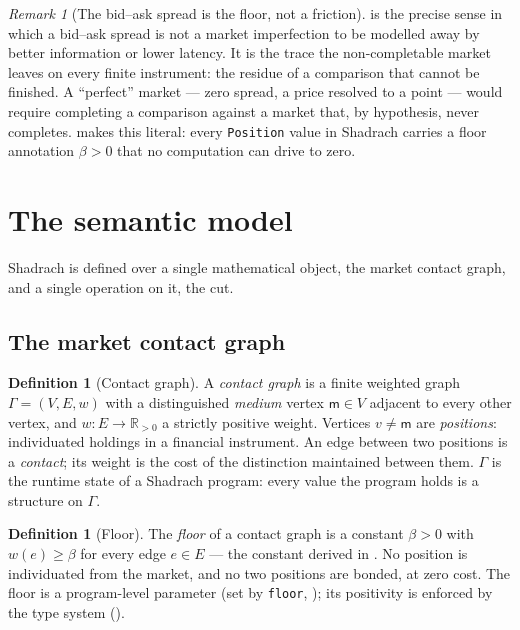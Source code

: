 \documentclass[11pt,a4paper]{article}
\theoremstyle{thmstyle}
\theoremstyle{definition}
\newtheorem{definition}[theorem]{Definition}
\theoremstyle{remark}
\newtheorem{remark}[theorem]{Remark}
\newcommand{\R}{\mathbb{R}}
\newcommand{\Gph}{\Gamma}
\newcommand{\V}{V}
\newcommand{\E}{E}
\newcommand{\wt}{w}
\newcommand{\flo}{\beta}
\newcommand{\medium}{\mathsf{m}}
\newcommand{\sh}[1]{\texttt{#1}}
\begin{document}
\begin{remark}[The bid--ask spread is the floor, not a friction]
\label{rem:spread-is-floor}
 is the precise sense in which a bid--ask spread
is not a market imperfection to be modelled away by better information
or lower latency. It is the trace the non-completable market leaves on
every finite instrument: the residue of a comparison that cannot be
finished. A ``perfect'' market --- zero spread, a price resolved to a
point --- would require completing a comparison against a market that,
by hypothesis, never completes.  makes this
literal: every \sh{Position} value in Shadrach carries a floor
annotation $\flo>0$ that no computation can drive to zero.
\end{remark}

\section{The semantic model}
\label{sec:model}

Shadrach is defined over a single mathematical object, the market
contact graph, and a single operation on it, the cut.

\subsection{The market contact graph}

\begin{definition}[Contact graph]
\label{def:contact-graph}
A \emph{contact graph} is a finite weighted graph $\Gph=(\V,\E,\wt)$
with a distinguished \emph{medium} vertex $\medium\in\V$ adjacent to
every other vertex, and $\wt\colon\E\to\R_{>0}$ a strictly positive
weight. Vertices $v\neq\medium$ are \emph{positions}: individuated
holdings in a financial instrument. An edge between two positions is a
\emph{contact}; its weight is the cost of the distinction maintained
between them. $\Gph$ is the runtime state of a Shadrach program: every
value the program holds is a structure on $\Gph$.
\end{definition}

\begin{definition}[Floor]
\label{def:floor}
The \emph{floor} of a contact graph is a constant $\flo>0$ with
$\wt(e)\ge\flo$ for every edge $e\in\E$ --- the constant derived in
. No position is individuated from the market,
and no two positions are bonded, at zero cost. The floor is a
program-level parameter (set by \sh{floor}, ); its
positivity is enforced by the type system ().
\end{definition}
\end{document}
